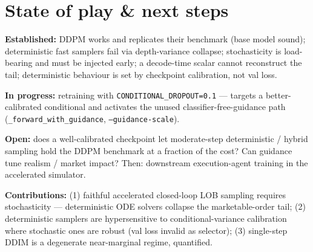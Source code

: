 \documentclass[11pt]{article}
\newcommand{\code}[1]{\texttt{\small #1}}
\begin{document}
\section{State of play \& next steps}

\textbf{Established:} DDPM works and replicates their benchmark (base model sound); deterministic
fast samplers fail via depth-variance collapse; stochasticity is load-bearing and must be injected
early; a decode-time scalar cannot reconstruct the tail; deterministic behaviour is set by
checkpoint calibration, not val loss.

\textbf{In progress:} retraining with \code{CONDITIONAL\_DROPOUT=0.1} --- targets a better-calibrated
conditional and activates the unused classifier-free-guidance path
(\code{\_forward\_with\_guidance}, \code{--guidance-scale}).

\textbf{Open:} does a well-calibrated checkpoint let moderate-step deterministic / hybrid sampling
hold the DDPM benchmark at a fraction of the cost? Can guidance tune realism / market impact? Then:
downstream execution-agent training in the accelerated simulator.

\textbf{Contributions:} (1) faithful accelerated closed-loop LOB sampling requires stochasticity ---
deterministic ODE solvers collapse the marketable-order tail; (2) deterministic samplers are
hypersensitive to conditional-variance calibration where stochastic ones are robust (val loss
invalid as selector); (3) single-step DDIM is a degenerate near-marginal regime, quantified.
\end{document}
